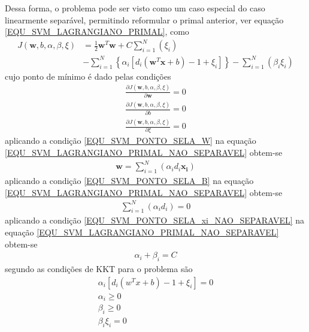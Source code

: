 Dessa forma, o problema pode ser visto como um caso especial do caso linearmente separável, permitindo reformular o primal anterior, ver equação \eqref{EQU_SVM_LAGRANGIANO_PRIMAL}, como
\begin{align}
\nonumber J(\mathbf{w}, b, \alpha, \beta, \xi) &= \frac{1}{2}\mathbf{w}^{T}\mathbf{w} + C\sum\limits_{i=1}^{N} \left( \xi_{i} \right)\\ &- \sum\limits_{i=1}^{N} \left\{\alpha_{i}[d_{i}(\mathbf{w}^{T}\mathbf{x} + b) - 1 + \xi_{i}]\right\} - \sum\limits_{i=1}^{N} \left( \beta_{i} \xi_{i} \right)  \label{EQU_SVM_LAGRANGIANO_PRIMAL_NAO_SEPARAVEL}
\end{align}
cujo ponto de mínimo é dado pelas condições
\begin{align}
 \frac{\partial J(\mathbf{w}, b, \alpha, \beta, \xi)}{\partial \mathbf{w}} = 0	\label{EQU_SVM_PONTO_SELA_W_NAO_SEPARAVEL}\\
 \frac{\partial J(\mathbf{w}, b, \alpha, \beta, \xi)}{\partial b} = 0  			\label{EQU_SVM_PONTO_SELA_B_NAO_SEPARAVEL}\\
 \frac{\partial J(\mathbf{w}, b, \alpha, \beta, \xi)}{\partial \xi} = 0  		\label{EQU_SVM_PONTO_SELA_xi_NAO_SEPARAVEL}
\end{align}
aplicando a condição \eqref{EQU_SVM_PONTO_SELA_W} na equação \eqref{EQU_SVM_LAGRANGIANO_PRIMAL_NAO_SEPARAVEL} obtem-se 
\begin{align}
\mathbf{w} = \sum\limits_{i=1}^{N} \left( \alpha_{i}d_{i}\mathbf{x_{i}} \right)  \label{EQU_SVM_PONTO_SELA_W_RESTRICAO_OBTIDA_NAO_SEPARAVEL}
\end{align}
aplicando a condição \eqref{EQU_SVM_PONTO_SELA_B} na equação \eqref{EQU_SVM_LAGRANGIANO_PRIMAL_NAO_SEPARAVEL} obtem-se 
\begin{align}
\sum\limits_{i=1}^{N} \left( \alpha_{i}d_{i} \right) = 0 \label{EQU_SVM_PONTO_SELA_B_RESTRICAO_OBTIDA_NAO_SEPARAVEL}
\end{align}
aplicando a condição \eqref{EQU_SVM_PONTO_SELA_xi_NAO_SEPARAVEL} na equação \eqref{EQU_SVM_LAGRANGIANO_PRIMAL_NAO_SEPARAVEL} obtem-se
\begin{align}
\alpha_{i}+\beta_{i} = C \label{EQU_SVM_PONTO_SELA_xi_RESTRICAO_OBTIDA_NAO_SEPARAVEL}
\end{align}
segundo  as condições de KKT para o problema são
\begin{align}
\alpha_{i}[d_{i}(w^{T}x + b) - 1 + \xi_{i}] = 0 \label{EQU_SVM_KKT1_NAO_SEPARAVEL}\\
\alpha_{i} \geq 0 \label{EQU_SVM_KKT2_NAO_SEPARAVEL}\\
\beta_{i} \geq 0 \label{EQU_SVM_KKT3_NAO_SEPARAVEL}\\
\beta_{i}\xi_{i} = 0 \label{EQU_SVM_KKT4_NAO_SEPARAVEL}
\end{align}
